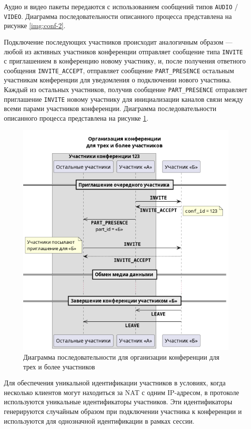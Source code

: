 Аудио и видео пакеты передаются с использованием сообщений типов \texttt{AUDIO} / \texttt{VIDEO}.
Диаграмма последовательности описанного процесса представлена на рисунке \ref{img:conf-2}.

Подключение последующих участников происходит аналогичным образом --- любой из активных участников конференции отправляет сообщение типа \texttt{INVITE} с приглашением в конференцию новому участнику, и, после получения ответного сообщения \texttt{INVITE\_ACCEPT}, отправляет сообщение \texttt{PART\_PRESENCE} остальным участникам конференции для уведомления о подключении нового участника.
Каждый из остальных участников, получив сообщение \texttt{PART\_PRESENCE} отправляет приглашение \texttt{INVITE} новому участнику для инициализации каналов связи между всеми парами участников конференции.
Диаграмма последовательности описанного процесса представлена на рисунке \ref{img:conf-3}.

\begin{figure}[H]
  \centering
  \includegraphics[width=0.9\linewidth]{inc/diag/seq-3/conf-3.png}
  \caption{Диаграмма последовательности для организации конференции для трех и более участников}
  \label{img:conf-3}
\end{figure}

Для обеспечения уникальной идентификации участников в условиях, когда несколько клиентов могут находиться за NAT с одним IP-адресом, в протоколе используются уникальные идентификаторы участников.
Эти идентификаторы генерируются случайным образом при подключении участника к конференции и используются для однозначной идентификации в рамках сессии.

